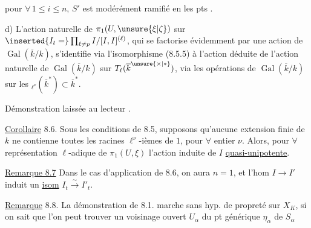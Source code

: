 pour $\forall\,1\leq i\leq n$, $S'$ est modérément ramifié en les pts  .

d) L'action naturelle de $\pi_1(U,\unsure{\xi|\zeta})$ sur $\inserted{I_t=}\prod_{\ell\ne p}I/[I,I]^{(\ell)}$, qui se factorise  évidemment par une action de $\operatorname{Gal}(\overline k/k)$, s'identifie via l'isomorphisme (8.5.5) à l'action  déduite de l'action naturelle de $\operatorname{Gal}(\overline k/k)$ sur $T_\ell(\overline k^{\unsure{\times|*}})$,  via les opérations de $\operatorname{Gal}(\overline k/k)$ sur les ${}_{\ell^\nu}(\overline k^*)\subset\overline k^*$.

Démonstration laissée au lecteur \unsure{---}.

\uline{Corollaire} 8.6. Sous les conditions de 8.5, supposons qu'aucune extension finie de $k$ ne contienne toutes les racines $\ell^\nu$-ièmes de $1$, pour $\forall$ entier $\nu$. Alors, pour $\forall$ représentation $\ell$-adique de $\pi_1(U,\xi)$  l'action induite de $I$   \uline{quasi-unipotente}.

\uline{Remarque 8.7}  Dans le cas d'application de 8.6, on aura
$n=1$, et l'hom $I\longrightarrow I'$ induit un \uline{isom} $I_t\xrightarrow{\sim}I'_t$.

\uline{Remarque}  8.8. La démonstration de 8.1. marche sans hyp. de propreté sur $X_K$, si on sait que l'on peut trouver un voisinage ouvert $U_\alpha$ du pt générique $\eta_\alpha$ de $S_\alpha$
